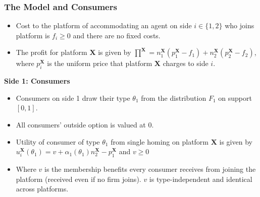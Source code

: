 \documentclass[11pt]{beamer}
\theoremstyle{boldstyle}
\begin{document}
\begin{frame}
	\frametitle{The Model and Consumers}
	\begin{small}
		\begin{itemize}
			\item Cost to the platform of accommodating an agent on side $i \in \{1,2\}$ who joins platform is $f_i \geq 0$ and there are no fixed costs.
			\item The profit for platform $\mathbf{X}$ is given by $\prod^{\mathbf{X}}=n_1^{\mathbf{X}} (p_1^{\mathbf{X}}-f_1)+ n_2^{\mathbf{X}} (p_2^{\mathbf{X}}-f_2)$, where $p_i^{\mathbf{X}}$ is the uniform price that platform $\mathbf{X}$ charges to side $i$.
		\end{itemize}
		
		\vspace{0.1cm}
		\textbf{Side 1: Consumers}
		\begin{itemize}
			\item Consumers on side 1 draw their type $\theta_1$ from the distribution $F_1$ on support $[0,1]$.
			\item All consumers' outside option is valued at 0.
			\item Utility of consumer of type $\theta_1$ from single homing on platform $\mathbf{X}$ is given by $u_i^{\mathbf{X}}(\theta_1) = v+\alpha_1(\theta_1) n_2^{\mathbf{X}}- p_1^{\mathbf{X}}$ and $v \geq 0$
			\item Where $v$ is the membership benefits every consumer receives from joining the platform (received even if no firm joins). $v$ is type-independent and identical across platforms.
		\end{itemize}
	\end{small}	
\end{frame}
		
\end{document}
